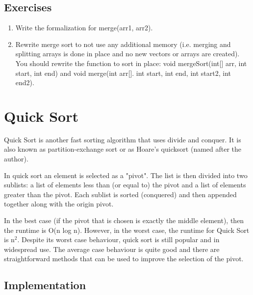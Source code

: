 \documentclass[11pt,oneside]{book}
\begin{document}
\subsection{Exercises}

\begin{enumerate}
\item Write the formalization for merge(arr1, arr2). 
\item Rewrite merge sort to not use any additional memory (i.e. merging and splitting arrays is done in place and no new vectors or arrays are created). You should rewrite the function to sort in place: void mergeSort(int[] arr, int start, int end) and void merge(int arr[]. int start, int end, int start2, int end2).
\end{enumerate}

        \section{ Quick Sort }
        

Quick Sort is another fast sorting algorithm that uses divide and conquer. It is also known as partition-exchange sort or as Hoare's quicksort (named after the author).

In quick sort an element is selected as a "pivot". The list is then divided into two sublists: a list of elements less than (or equal to) the pivot and a list of elements greater than the pivot. Each sublist is sorted (conquered) and then appended together along with the origin pivot.

In the best case (if the pivot that is chosen is exactly the middle element), then the runtime is O(n log n). However, in the worst case, the runtime for Quick Sort is n$^{2}$. Despite its worst case behaviour, quick sort is still popular and in widespread use. The average case behaviour is quite good and there are straightforward methods that can be used to improve the selection of the pivot.

\subsection{Implementation}
\end{document}
